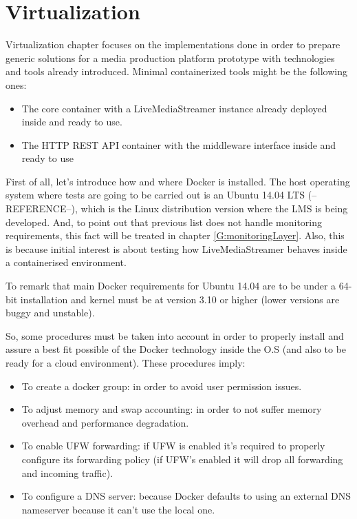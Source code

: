 \chapter{Virtualization}\label{D:virtualization}

Virtualization chapter focuses on the implementations done in order to prepare generic solutions for a media production platform prototype with technologies and tools already introduced. Minimal containerized tools might be the following ones:

\begin{itemize}
\item The core container with a LiveMediaStreamer instance already deployed inside and ready to use.
\item The HTTP REST API container with the middleware interface inside and ready to use
\end{itemize}

First of all, let's introduce how and where Docker is installed. The host operating system where tests are going to be carried out is an Ubuntu 14.04 LTS (--REFERENCE--), which is the Linux distribution version where the LMS is being developed. And, to point out that previous list does not handle monitoring requirements, this fact will be treated in chapter \ref{G:monitoringLayer}. Also, this is because initial interest is about testing how LiveMediaStreamer behaves inside a containerised environment.

To remark that main Docker requirements for Ubuntu 14.04 are to be under a 64-bit installation and kernel must be at version 3.10 or higher (lower versions are buggy and unstable). 

So, some procedures must be taken into account in order to properly install and assure a best fit possible of the Docker technology inside the O.S (and also to be ready for a cloud environment). These procedures imply:

\begin{itemize}
\item To create a docker group: in order to avoid user permission issues.
\item To adjust memory and swap accounting: in order to not suffer memory overhead and performance degradation.
\item To enable UFW forwarding: if UFW is enabled it's required to properly configure its forwarding policy (if UFW's enabled it will drop all forwarding and incoming traffic).
\item To configure a DNS server: because Docker defaults to using an external DNS nameserver because it can't use the local one.
\end{itemize}

